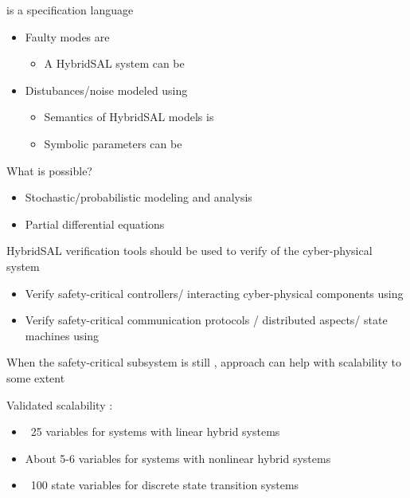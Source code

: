 \documentclass{seminar}
\begin{document}
\begin{slide}

{} is a {} specification language

\begin{itemize}
\item
 Faulty modes are {}
 \begin{itemize}
 \item  A HybridSAL system can be {}
 \end{itemize}

\item Distubances/noise modeled using {}
 \begin{itemize}
 \item  Semantics of HybridSAL models is {}
 \item  Symbolic parameters can be {}
 \end{itemize}
\end{itemize}

\medskip
What is {} possible?
\begin{itemize}
\item Stochastic/probabilistic modeling and analysis
\item Partial differential equations
\end{itemize}

\end{slide}
\begin{slide}

HybridSAL verification tools should be used to verify
{} of the cyber-physical system

\begin{itemize}
\item Verify safety-critical controllers/ 
 interacting cyber-physical components using {}
\item Verify safety-critical communication protocols /
 distributed aspects/ state machines using {}
\end{itemize}

When the safety-critical subsystem is still {},
{} approach can help with 
scalability to some extent

Validated scalability {}:
\begin{itemize}
\item ~25 variables for systems with linear hybrid systems
\item About 5-6 variables for systems with nonlinear hybrid systems
\item ~100 state variables for discrete state transition systems
\end{itemize}

\end{slide}
\end{document}
